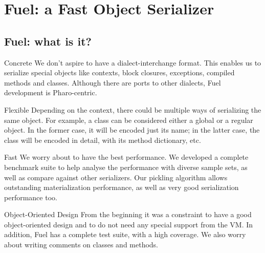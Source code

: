 \documentclass[a4paper,10pt,twoside]{book}
\begin{document}
\fi
\sloppy

\chapter{Fuel: a Fast Object Serializer}





\section{Fuel: what is it?}


Concrete
We don't aspire to have a dialect-interchange format. This enables us to serialize special objects like contexts, block closures, exceptions, compiled methods and classes. Although there are ports to other dialects, Fuel development is Pharo-centric.

Flexible
Depending on the context, there could be multiple ways of serializing the same object. For example, a class can be considered either a global or a regular object. In the former case, it will be encoded just its name; in the latter case, the class will be encoded in detail, with its method dictionary, etc.

Fast
We worry about to have the best performance. We developed a complete benchmark suite to help analyse the performance with diverse sample sets, as well as compare against other serializers. Our pickling algorithm allows outstanding materialization performance, as well as very good serialization performance too.

Object-Oriented Design
From the beginning it was a constraint to have a good object-oriented design and to do not need any special support from the VM. In addition, Fuel has a complete test suite, with a high coverage. We also worry about writing comments on classes and methods.
\end{document}
